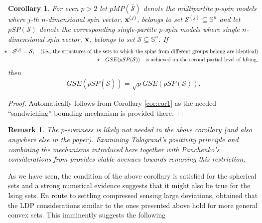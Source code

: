 \documentclass[10pt]{article}
\def\x{{\bf x}}
\def\x{{\mathbf x}}
\def\x{{\bf x}}
\def\x{{\bf x}}
\def\mS{{\mathbb S}}
\def\x{{\bf x}}
\def\x{{\mathbf x}}
\def\x{{\bf x}}
\def\x{{\bf x}}
\def\cS{{\mathcal S}}
\def\bcS{\bar{\mathcal S}}
\newtheorem{corollary}{Corollary}
\newtheorem{remark}{Remark}
\begin{document}
\begin{corollary}
For even $p>2$  let $pMP(\bcS)$ denote the multipartite $p$-spin models where $j$-th $n$-dimensional spin vector, $\x^{(j)}$, belongs to set $\cS^{(j)}\subseteq\mS^n$ and let $pSP(\cS)$ denote the corresponding single-partite $p$-spin models where single $n$-dimensional spin vector, $\x$,  belongs to set $\cS\subseteq\mS^n$. If
   \begin{eqnarray}
   \label{eq:cor3eq1}
   & & \hspace{-.25in} \star \quad  \cS^{(j)}=\cS, \quad (\mbox{i.e., the structures of the sets to which the spins from different groups belong are identical})
\nonumber \\
   & & \hspace{-.25in}  \star \quad  GSE(pSP(\cS)) \quad \mbox{is achieved on the second partial level of lifting},\nonumber
   \end{eqnarray}
   then
   \begin{eqnarray}
   \label{eq:cor3eq2}
    GSE(pSP(\bcS))= \sqrt{p} GSE(pSP(\cS)) .
   \end{eqnarray}
   \label{cor:cor3}
\end{corollary}

\begin{proof}
Automatically follows from  Corollary \ref{cor:cor1} as the needed ``sandwiching'' bounding mechanism is provided there.
\end{proof}

\begin{remark}
The $p$-evenness is likely not needed in the above corollary (and also anywhere else in the paper). Examining Talagrand's positivity principle \cite{Talpos00} and combining the  mechanisms introduced here together  with Panchenko's considerations from \cite{Pan10,Pan10a,Pan13,Pan13a,Pan13b} provides viable avenues towards removing this restriction.
\end{remark}

As we have seen, the condition of the above corollary is satisfied for the spherical sets and a strong numerical evidence suggests that it might also be true for the Ising sets. En route to settling compressed sensing large deviations,  \cite{Stojnicl1RegPosasym} obtained that the LDP considerations similar to the ones presented above hold for more general convex sets. This imminently suggests the following
\end{document}
